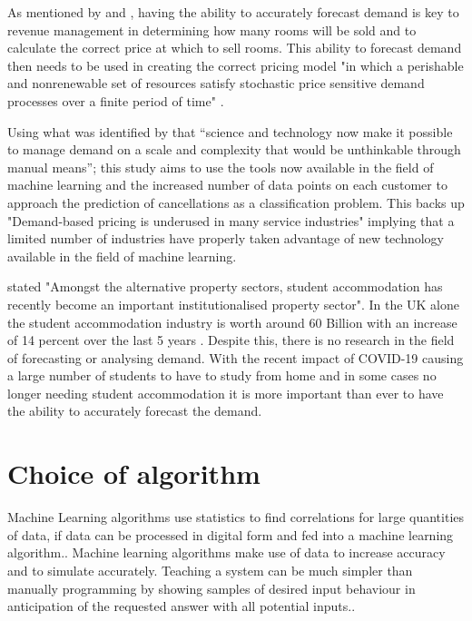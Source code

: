 \vspace{5mm}

As mentioned by \cite{RevenueWorldCat.org} and \cite{Weatherford2003AManagement}, having the ability to accurately forecast demand is key to revenue management in determining how many rooms will be sold and to calculate the correct price at which to sell rooms. This ability to forecast demand then needs to be used in creating the correct pricing model "in which a perishable and nonrenewable set of resources satisfy stochastic price sensitive demand processes over a finite period of time" \cite{Bitran2003AnManagement}.

\vspace{5mm}

Using what was identified by \cite{Talluri2004TheManagement} that “science and technology now make it possible to manage demand on a scale and complexity that would be unthinkable through manual means”; this study aims to use the tools now available in the field of machine learning and the increased number of data points on each customer to approach the prediction of cancellations as a classification problem. This backs up "Demand-based pricing is underused in many service industries" \cite{Kimes2003HasAcceptable} implying that a limited number of industries have properly taken advantage of new technology available in the field of machine learning.

\vspace{5mm}

\cite{Newell2018TheSector} stated "Amongst the alternative property sectors, student accommodation has recently become an important institutionalised property sector". In the UK alone the student accommodation industry is worth around 60 Billion \cite{UKWakefield} with an increase of 14 percent over the last 5 years \cite{UKWakefield}. Despite this, there is no research in the field of forecasting or analysing demand. With the recent impact of COVID-19 causing a large number of students to have to study from home and in some cases no longer needing student accommodation it is more important than ever to have the ability to accurately forecast the demand. 

\section{Choice of algorithm}

Machine Learning algorithms use statistics to find correlations for large quantities of data, if data can be processed in digital form and fed into a machine learning algorithm.\cite{Chen2019MehryarEdition}. Machine learning algorithms make use of data to increase accuracy and to simulate accurately. Teaching a system can be much simpler than manually programming by showing samples of desired input behaviour in anticipation of the requested answer with all potential inputs.\cite{Jordan2015MachineProspects}. 

